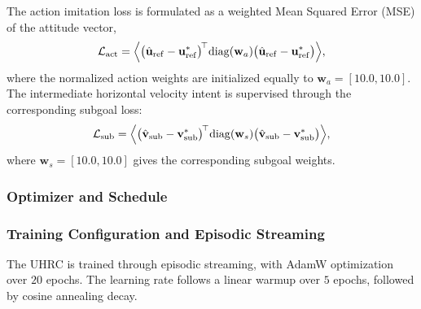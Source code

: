 \documentclass[12pt, a4paper]{article}
\begin{document}
The action imitation loss is formulated as a weighted Mean Squared Error (MSE) of the attitude vector,
\begin{equation}
    \mathcal{L}_{\mathrm{act}} = 
        \Bigl\langle 
            \bigl(\hat{\mathbf{u}}_{\mathrm{ref}} - \mathbf{u}_{\mathrm{ref}}^*\bigr)^{\!\top} 
            \mathrm{diag}(\mathbf{w}_a) 
            \bigl(\hat{\mathbf{u}}_{\mathrm{ref}} - \mathbf{u}_{\mathrm{ref}}^*\bigr) 
        \Bigr\rangle,
\end{equation}
where the normalized action weights are initialized equally to $\mathbf{w}_a = [10.0, 10.0]$.
The intermediate horizontal velocity intent is supervised through the corresponding subgoal loss:
\begin{equation}
    \mathcal{L}_{\mathrm{sub}} = 
        \Bigl\langle 
            \bigl(\hat{\mathbf{v}}_{\mathrm{sub}} - \mathbf{v}_{\mathrm{sub}}^*\bigr)^{\!\top} 
            \mathrm{diag}(\mathbf{w}_s) 
            \bigl(\hat{\mathbf{v}}_{\mathrm{sub}} - \mathbf{v}_{\mathrm{sub}}^*\bigr) 
        \Bigr\rangle,
\end{equation}
where $\mathbf{w}_s = [10.0, 10.0]$ gives the corresponding subgoal weights.





\subsubsection{Optimizer and Schedule}

\subsubsection{Training Configuration and Episodic Streaming}
\label{sec:training_config}

The UHRC is trained through episodic streaming, with AdamW optimization over $20$ epochs.
The learning rate follows a linear warmup over $5$ epochs, followed by cosine annealing decay.
\end{document}
